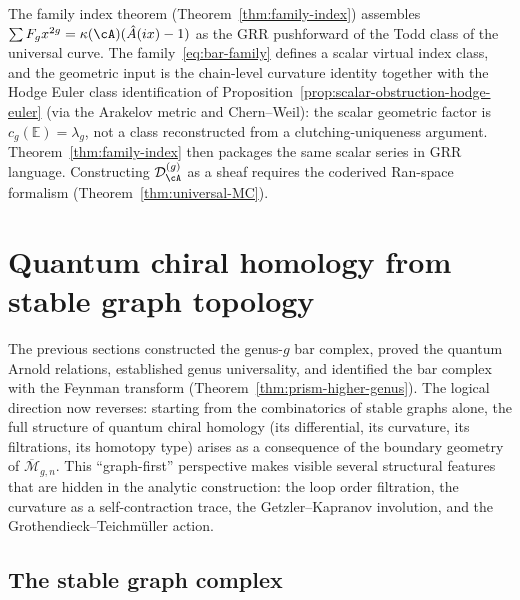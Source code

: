 \begin{remark}\label{rem:towards-family-index}
The family index theorem (Theorem~\ref{thm:family-index}) assembles
$\sum F_g x^{2g}=\kappa(\cA)(\hat{A}(ix)-1)$ as the GRR
pushforward of the Todd class of the universal curve.
The family~\eqref{eq:bar-family} defines a scalar virtual index
class, and the geometric input is the chain-level curvature
identity together with the Hodge Euler class identification of
Proposition~\ref{prop:scalar-obstruction-hodge-euler}
(via the Arakelov metric and Chern--Weil): the scalar
geometric factor is $c_g(\mathbb{E})=\lambda_g$, not a class
reconstructed from a clutching-uniqueness argument.
Theorem~\ref{thm:family-index} then
packages the same scalar series in GRR language. Constructing
$\mathcal{D}_{\cA}^{(g)}$ as a
sheaf requires the coderived Ran-space formalism
(Theorem~\ref{thm:universal-MC}).
\end{remark}


\section{Quantum chiral homology from stable graph topology}
\label{sec:quantum-chiral-homology-first-principles}

The previous sections constructed the genus-$g$ bar complex, proved
the quantum Arnold relations, established genus universality, and
identified the bar complex with the Feynman transform
(Theorem~\ref{thm:prism-higher-genus}). The logical direction now
reverses: starting from the combinatorics of stable graphs alone,
the full structure of quantum chiral homology (its differential, its
curvature, its filtrations, its homotopy type) arises as a
consequence of the boundary geometry of
$\overline{\mathcal{M}}_{g,n}$. This ``graph-first'' perspective
makes visible several structural features that are hidden in the
analytic construction: the loop order filtration, the curvature as a
self-contraction trace, the Getzler--Kapranov involution, and the
Grothendieck--Teichm\"uller action.

\subsection{The stable graph complex}
\label{subsec:stable-graph-complex}

